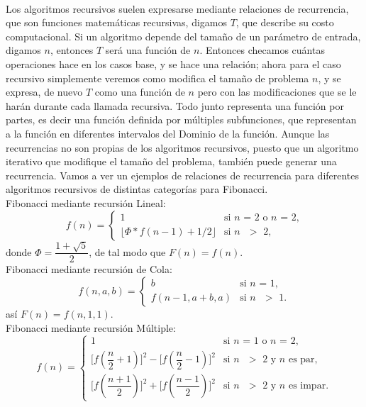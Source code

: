 \documentclass[12pt,twoside]{article}
\begin{document}
\\ Los algoritmos recursivos suelen expresarse mediante relaciones de recurrencia, que son funciones matemáticas recursivas, digamos $T$, que describe su costo computacional. Si un algoritmo depende del tamaño de un parámetro de entrada, digamos $n$, entonces $T$ será una función de $n$. Entonces checamos cuántas operaciones hace en los casos base, y se hace una relación; ahora para el caso recursivo simplemente veremos como modifica el tamaño de problema $n$, y se expresa, de nuevo $T$ como una función de $n$ pero con las modificaciones que se le harán durante cada llamada recursiva. Todo junto representa una función por partes, es decir una función definida por múltiples subfunciones, que representan a la función en diferentes intervalos del Dominio de la función. Aunque las recurrencias no son propias de los algoritmos recursivos, puesto que un algoritmo iterativo que modifique el tamaño del problema, también puede generar una recurrencia.
\newpage
Vamos a ver un ejemplos de relaciones de recurrencia para diferentes algoritmos recursivos de distintas categorías para Fibonacci.
\newline
\\ Fibonacci mediante recursión Lineal:
\begin{equation}
    f(n)=
    \begin{cases}
        1 &\text{si $n$ = 2 o $n$ = 2,} \\
        \lfloor \Phi * f(n-1)+1/2 \rfloor &\text{si $n$ $>$ 2,}
    \end{cases}
\end{equation}
donde $\Phi=\dfrac{1+\sqrt{5}}{2}$, de tal modo que $F(n)=f(n)$.
\newline
\\ Fibonacci mediante recursión de Cola:
\begin{equation}
    f(n,a,b)=
    \begin{cases}
        b &\text{si $n$ = 1,} \\
        f(n-1,a+b,a) &\text{si $n$ $>$ 1.}
    \end{cases}
\end{equation}
así $F(n)=f(n,1,1)$.
\newline
\\ Fibonacci mediante recursión Múltiple:
\begin{equation}
    f(n)=
    \begin{cases}
        1 &\text{si $n$ = 1 o $n$ = 2,} \\
        \text{[$f(\dfrac{n}{2}+1)]^2$} - \text{[$f(\dfrac{n}{2}-1)]^2$}  &\text{si $n$ $>$ 2 y $n$ es par,} \\
        \text{[$f(\dfrac{n+1}{2})]^2$} + \text{[$f(\dfrac{n-1}{2})]^2$}  &\text{si $n$ $>$ 2 y $n$ es impar.}
    \end{cases}
\end{equation}
\end{document}
